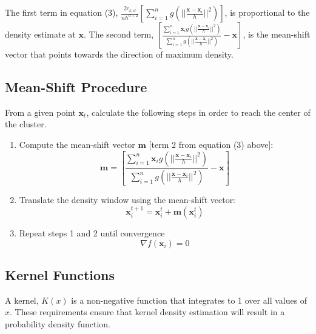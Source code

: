 \documentclass{article}
\begin{document}
The first term in equation (3), $\frac{2c_{k,d}}{nh^{d+2}}\left[\sum_{i=1}^ng\left(||\frac{\mathbf{x}-\mathbf{x}_i}{h}||^2\right)\right]$, is proportional to the density estimate at $\mathbf{x}$. The second term, $\left[\frac{\sum_{i=1}^n\mathbf{x}_ig\left(||\frac{\mathbf{x}-\mathbf{x}_i}{h}||^2\right)}{\sum_{i=1}^ng\left(||\frac{\mathbf{x}-\mathbf{x}_i}{h}||^2\right)}-\mathbf{x}\right]$, is the mean-shift vector that points towards the direction of maximum density.

\subsection{Mean-Shift Procedure}

From a given point $\mathbf{x}_t$, calculate the following steps in order to reach the center of the cluster.
\begin{enumerate}
	\item Compute the mean-shift vector $\mathbf{m}$ [term 2 from equation (3) above]:
    \begin{equation}
    \mathbf{m}=\left[\frac{\sum_{i=1}^n\mathbf{x}_ig\left(||\frac{\mathbf{x}-\mathbf{x}_i}{h}||^2\right)}{\sum_{i=1}^ng\left(||\frac{\mathbf{x}-\mathbf{x}_i}{h}||^2\right)}-\mathbf{x}\right]
    \end{equation}
    \item Translate the density window using the mean-shift vector:
    \begin{equation}
    \mathbf{x}_i^{t+1}=\mathbf{x}_i^t+\mathbf{m}(\mathbf{x}_i^t)
    \end{equation}
    \item Repeat steps 1 and 2 until convergence
    \begin{equation}
    \nabla f(\mathbf{x}_i)=0
    \end{equation}
\end{enumerate}

\subsection{Kernel Functions}

A kernel, $K(x)$ is a non-negative function that integrates to 1 over all values of $x$. These requirements ensure that kernel density estimation will result in a probability density function.
\end{document}
